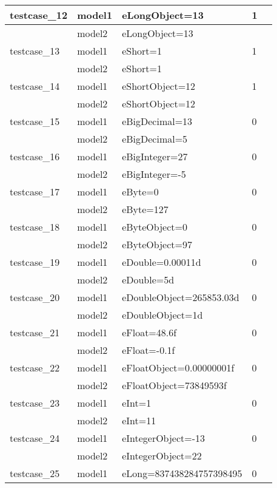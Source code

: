 \documentclass[a4paper]{article}
\begin{document}
\begin{longtable}{|l|l|l|l|l|}
\hline
\hline
testcase\_12 & model1 & eLongObject=13 & 1 &\\
\hline
             & model2 & eLongObject=13 & &\\
\hline
\hline
testcase\_13 & model1 & eShort=1 & 1 &\\
\hline
             & model2 & eShort=1 & &\\
\hline
\hline
testcase\_14 & model1 & eShortObject=12 & 1 &\\
\hline
             & model2 & eShortObject=12 & &\\
\hline
\hline
testcase\_15 & model1 & eBigDecimal=13 & 0 &\\
\hline
             & model2 & eBigDecimal=5 & &\\
\hline
\hline
testcase\_16 & model1 & eBigInteger=27 & 0 &\\
\hline
             & model2 & eBigInteger=-5 & &\\
\hline
\hline
testcase\_17 & model1 & eByte=0 & 0 &\\
\hline
             & model2 & eByte=127 & &\\
\hline
\hline
testcase\_18 & model1 & eByteObject=0 & 0 &\\
\hline
             & model2 & eByteObject=97 & &\\
\hline
\hline
testcase\_19 & model1 & eDouble=0.00011d & 0 &\\
\hline
             & model2 & eDouble=5d & &\\
\hline
\hline
testcase\_20 & model1 & eDoubleObject=265853.03d & 0 &\\
\hline
             & model2 & eDoubleObject=1d & &\\
\hline
\hline
testcase\_21 & model1 & eFloat=48.6f & 0 &\\
\hline
             & model2 & eFloat=-0.1f & &\\
\hline
\hline
testcase\_22 & model1 & eFloatObject=0.00000001f & 0 &\\
\hline
             & model2 & eFloatObject=73849593f & &\\
\hline
\hline
testcase\_23 & model1 & eInt=1 & 0 &\\
\hline
             & model2 & eInt=11 & &\\
\hline
\hline
testcase\_24 & model1 & eIntegerObject=-13 & 0 &\\
\hline
             & model2 & eIntegerObject=22 & &\\
\hline
\hline
testcase\_25 & model1 & eLong=837438284757398495 & 0 &\\

\end{longtable}
\end{document}
